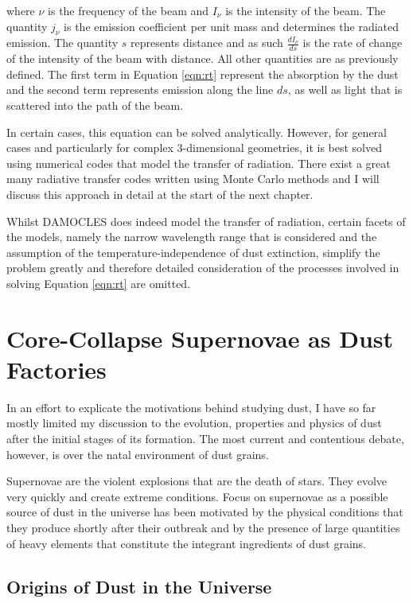 \noindent where $\nu$ is the frequency of the beam and $I_{\nu}$ is the intensity of the beam.  The quantity $j_{\nu}$ is the emission coefficient per unit mass and determines the radiated emission.  The quantity $s$ represents distance and as such $\frac{dI_{\nu}}{ds}$ is the rate of change of the intensity of the beam with distance.  All other quantities are as previously defined.  The first term in Equation \ref{eqn:rt} represent the absorption by the dust and the second term represents emission along the line $ds$, as well as light that is scattered into the path of the beam.

In certain cases, this equation can be solved analytically.  However, for general cases and particularly for complex 3-dimensional geometries, it is best solved using numerical codes that model the transfer of radiation.  There exist a great many radiative transfer codes written using Monte Carlo methods and I will discuss this approach in detail at the start of the next chapter. 

Whilst DAMOCLES does indeed model the transfer of radiation, certain facets of the models, namely the narrow wavelength range that is considered and the assumption of the temperature-independence of dust extinction, simplify the problem greatly and therefore detailed consideration of the processes involved in solving Equation \ref{eqn:rt} are omitted.

\section{Core-Collapse Supernovae as Dust Factories}
\label{scn:ccsne}
In an effort to explicate the motivations behind studying dust, I have so far mostly limited my discussion to the evolution, properties and physics of dust after the initial stages of its formation.  The most current and contentious debate, however, is over the natal environment of dust grains.  

Supernovae are the violent explosions that are the death of stars.  They evolve very quickly and create extreme conditions.  Focus on supernovae as a possible source of dust in the universe has been motivated by the physical conditions that they produce shortly after their outbreak and by the presence of large quantities of heavy elements that constitute the integrant ingredients of dust grains.

\subsection{Origins of Dust in the Universe}

